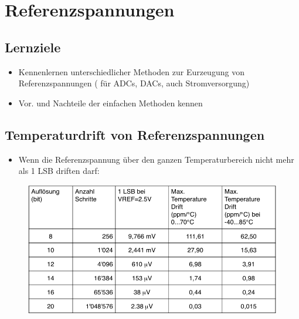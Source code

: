 \section{Referenzspannungen} 
\subsection{Lernziele}
\begin{itemize}
  \item Kennenlernen unterschiedlicher Methoden zur Eurzeugung von
  Referenzspannungen ( für ADCs, DACs, auch Stromversorgung)
  \item Vor. und Nachteile der einfachen Methoden kennen
\end{itemize}

\subsection{Temperaturdrift von Referenzspannungen}
\begin{itemize}
  \item Wenn die Referenzspannung über den ganzen Temperaturbereich nicht mehr
  als 1 LSB driften darf:
\end{itemize}
\begin{figure}[!htbp]
\includegraphics[scale=0.5]{pictures/temperaturdrift}
\end{figure}
